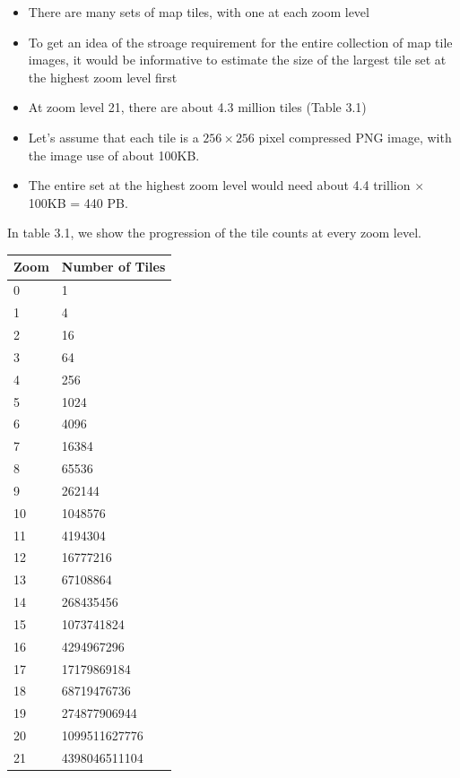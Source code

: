 \documentclass{report}
\theoremstyle{definition}
\begin{document}
\begin{itemize}
\item
There are many sets of map tiles, with one at each zoom level
\item
To get an idea of the stroage requirement for the entire collection of map tile images, it would be informative to estimate the
size of the largest tile set at the highest zoom level first
\item
At zoom level 21, there are about 4.3 million tiles (Table 3.1)
\item
Let's assume that each tile is a $256 \times 256$ pixel compressed PNG image, with the image use of about 100KB.
\item
The entire set at the highest zoom level would need about 4.4 trillion $\times$ 100KB = 440 PB.
\end{itemize}

In table 3.1, we show the progression of the tile counts at every zoom level.

\begin{tabular}{|p{6cm}|p{6cm}|}
\hline
Zoom & Number of Tiles \\
\hline
0 & 1 \\
\hline
1 & 4 \\
\hline
2 & 16 \\
\hline
3 & 64 \\
\hline
4 & 256 \\
\hline
5 & 1024\\
\hline
6 & 4096 \\
\hline
7 & 16384 \\
\hline
8 & 65536 \\
\hline
9 & 262144 \\
\hline
10 & 1048576 \\
\hline
11 & 4194304 \\
\hline
12 & 16777216 \\
\hline
13 & 67108864 \\
\hline
14 & 268435456 \\
\hline
15 & 1073741824 \\
\hline
16 & 4294967296 \\
\hline
17 & 17179869184 \\
\hline
18 & 68719476736 \\
\hline
19 & 274877906944 \\
\hline
20 & 1099511627776 \\
\hline
21 & 4398046511104 \\
\hline
\end{tabular}
\end{document}
